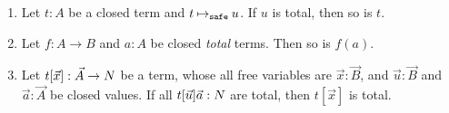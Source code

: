 \begin{lemma}\label{lem:total_value}
  \begin{enumerate}
  \item\label{lem:total_value1}
    Let $t:A$ be a closed term and $t \mathbin{\mathbin{\mapsto}_{\hbox{\scriptsize \tt safe}}} u$.
    If $u$ is total, then so is $t$.
  \item\label{lem:total_value2}
    Let $f:A \rightarrow B$ and $a:A$ be closed \emph{total} terms.
    Then so is $f(a)$.
  \item\label{lem:total_value3}
    Let $t[\vec{x}]:\vec{A}\rightarrow{N}$ be a term,
    whose all free variables are $\vec{x}:\vec{B}$,
    and $\vec{u}:\vec{B}$ and $\vec{a}:\vec{A}$ be closed values.
    If all $t[\vec{u}]\vec{a}:{N}$ are total, then $t[\vec{x}]$ is total. 
  \end{enumerate}
\end{lemma}
